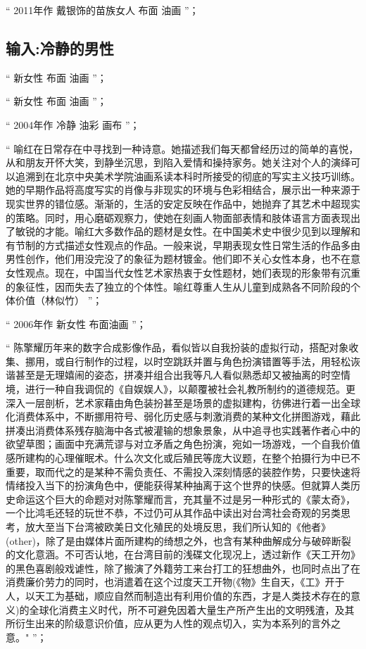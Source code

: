 \documentclass[master,oneside]{zjuthesis}
\begin{document}
“ 2011年作 戴银饰的苗族女人 布面 油画 ”；
\subsection{输入:冷静的男性}

“ 新女性 布面 油画 ”；

“ 新女性 布面 油画 ”；

“ 2004年作 冷静 油彩 画布 ”；

“ 喻红在日常存在中寻找到一种诗意。她描述我们每天都曾经历过的简单的喜悦，从和朋友开怀大笑，到静坐沉思，到陷入爱情和操持家务。她关注对个人的演绎可以追溯到在北京中央美术学院油画系读本科时所接受的彻底的写实主义技巧训练。她的早期作品将高度写实的肖像与非现实的环境与色彩相结合，展示出一种来源于现实世界的错位感。渐渐的，生活的安定反映在作品中，她抛弃了其艺术中超现实的策略。同时，用心磨砺观察力，使她在刻画人物面部表情和肢体语言方面表现出了敏锐的才能。喻红大多数作品的题材是女性。在中国美术史中很少见到以理解和有节制的方式描述女性观点的作品。一般来说，早期表现女性日常生活的作品多由男性创作，他们用没完没了的象征为题材镀金。他们即不关心女性本身，也不在意女性观点。现在，中国当代女性艺术家热衷于女性题材，她们表现的形象带有沉重的象征性，因而失去了独立的个体性。喻红尊重人生从儿童到成熟各不同阶段的个体价值（林似竹） ”；

“ 2006年作 新女性 布面油画 ”；

“ 陈擎耀历年来的数字合成影像作品，看似皆以自我扮装的虚拟行动，搭配对象收集、挪用，或自行制作的过程，以时空跳跃并置与角色扮演错置等手法，用轻松诙谐甚至是无理嬉闹的姿态，拼凑并组合出我等凡人看似熟悉却又被抽离的时空情境，进行一种自我调侃的《自娱娱人》，以颠覆被社会礼教所制约的道德规范。更深入一层剖析，艺术家藉由角色装扮甚至是场景的虚拟建构，彷佛进行着一出全球化消费体系中，不断挪用符号、弱化历史感与刺激消费的某种文化拼图游戏，藉此拼凑出消费体系残存脑海中各式被灌输的想象景象，从中追寻也实践著作者心中的欲望草图；画面中充满荒谬与对立矛盾之角色扮演，宛如一场游戏，一个自我价值感所建构的心理催眠术。什么次文化或后殖民等庞大议题，在整个拍摄行为中已不重要，取而代之的是某种不需负责任、不需投入深刻情感的装腔作势，只要快速将情绪投入当下的扮演角色中，便能获得某种抽离于这个世界的快感。但就算人类历史命运这个巨大的命题对对陈擎耀而言，充其量不过是另一种形式的《蒙太奇》，一个比鸿毛还轻的玩世不恭，不过仍可从其作品中读出对台湾社会奇观的另类思考，放大至当下台湾被欧美日文化殖民的处境反思，我们所认知的《他者》(other)，除了是由媒体片面所建构的绮想之外，也含有某种曲解成分与破碎断裂的文化意涵。不可否认地，在台湾目前的浅碟文化现况上，透过新作《天工开勿》的黑色喜剧般戏谑性，除了搬演了外籍劳工来台打工的狂想曲外，也同时点出了在消费廉价劳力的同时，也消遣着在这个过度天工开物(《物》生自天，《工》开于人，以天工为基础，顺应自然而制造出有利用价值的东西，才是人类技术存在的意义)的全球化消费主义时代，所不可避免因着大量生产所产生出的文明残渣，及其所衍生出来的阶级意识价值，应从更为人性的观点切入，实为本系列的言外之意。" ”；
\end{document}
